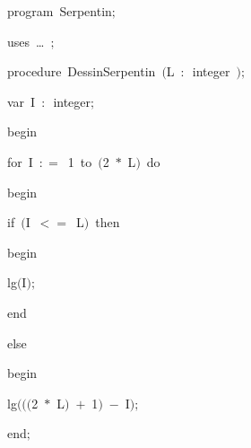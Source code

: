 
{
\parindent {}
\medskip

\carrenoir
\vspace{\neglskip}\mbox{\blc  \idt  \mcl program\idt\ Serpentin$;$
}\par 
\vspace{\neglskip}\mbox{\blc \blk\idt \mcl uses\idt \ \ldots\ $;$
}\par 
\medskip

\pagebreak[3] 
\vspace{\neglskip}\mbox{\blc  \blk\idt  \mcl procedure\idt \ DessinSerpentin\ $($L\ $:$\ integer\ $)$$;$}\par 
\pagebreak[3] 
\vspace{\neglskip}\mbox{\blc  \blk\blk\idt  \mcl var\idt \ I\ $:$\ integer$;$}\par 
\vspace{\neglskip}\mbox{\blc  \blk\idt  \mcl begin\idt }\par 
\pagebreak[3] 
\vspace{\neglskip}\mbox{\blc  \blk\blk\idt  \mcl for\idt \ I\ $:$$=$\ 1\ \mcl to\idt \ $($2\ $\ast$\ L$)$\ \mcl do\idt }\par 
\vspace{\neglskip}\mbox{\blc  \blk\blk\blk\idt  \mcl begin\idt }\par 
\pagebreak[3] 
\vspace{\neglskip}\mbox{\blc  \blk\blk\blk\blk\idt  \mcl if\idt \ $($I\ $<$$=$\ L$)$\ \mcl then\idt }\par 
\vspace{\neglskip}\mbox{\blc  \blk\blk\blk\blk\blk\idt  \mcl begin\idt }\par 
\vspace{\neglskip}\mbox{\blc  \blk\blk\blk\blk\blk\blk\idt  lg$($I$)$$;$}\par 
\vspace{\neglskip}\mbox{\blc  \blk\blk\blk\blk\blk\idt  \mcl end\idt }\par 
\pagebreak[3] 
\vspace{\neglskip}\mbox{\blc  \blk\blk\blk\blk\idt  \mcl else\idt }\par 
\vspace{\neglskip}\mbox{\blc  \blk\blk\blk\blk\blk\idt  \mcl begin\idt }\par 
\vspace{\neglskip}\mbox{\blc  \blk\blk\blk\blk\blk\blk\idt  lg$($$($$($2\ $\ast$\ L$)$\ $+$\ 1$)$\ $-$\ I$)$$;$}\par 
\vspace{\neglskip}\mbox{\blc  \blk\blk\blk\blk\blk\idt  \mcl end\idt $;$}\par 
}
